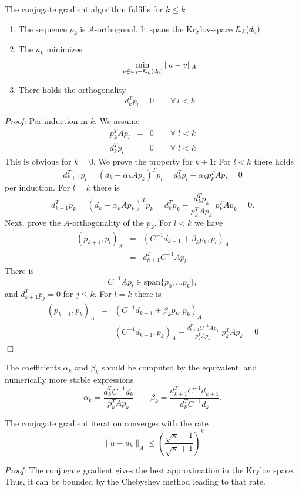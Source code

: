 \begin{theorem} The conjugate gradient algorithm fulfills for $k \leq \overline{k}$
\begin{enumerate}
\item
The sequence $p_k$ is $A$-orthogonal. It spans the Krylov-space ${\cal K}_k(d_0)$
\item
The $u_k$ minimizes
$$
\min_{v \in u_0 + {\cal K}_k(d_0)} \| u - v \|_A
$$
\item
There holds the orthogonality
$$
d_k^T p_l = 0 \qquad \forall \, l < k
$$
\end{enumerate}
\end{theorem}
\noindent
{\em Proof:} Per induction in $k$. We assume 
\begin{eqnarray*}
p_k^T A p_l & = & 0 \qquad \forall \; l < k \\
d_k^T p_l & = & 0 \qquad \forall \; l < k 
\end{eqnarray*}
This is obvious for $k = 0$. We prove the property for $k+1$:
For $l < k$ there holds
$$
d_{k+1}^T p_l = (d_k - \alpha_k A p_k)^T p_l = 
        d_k^T p_l - \alpha_k p_k^T A p_l = 0
$$
per induction. For $l = k$ there is
$$
d_{k+1}^T p_k = (d_k-\alpha_k A p_k)^T p_k = d_k^T p_k - \frac{d_k^T p_k}{p_k^T A p_k}\; p_k^T A p_k = 0.
$$ 
Next, prove the $A$-orthogonality of the $p_k$. For $l < k$ we have
\begin{eqnarray*}
(p_{k+1}, p_l)_A & = & (C^{-1} d_{k+1} + \beta_k p_k, p_l)_A \\
        & = & d_{k+1}^T C^{-1} A p_l
\end{eqnarray*}
There is
$$
C^{-1} A p_l \in \mbox{span} \{ p_0, \ldots p_k \}, 
$$
and $d_{k+1}^T p_j = 0$ for $j \leq k$. For $l = k$ there is
\begin{eqnarray*}
(p_{k+1}, p_k)_A & = & (C^{-1} d_{k+1} + \beta_k p_k, p_k)_A \\
        & = & (C^{-1} d_{k+1}, p_k)_A   
                -\frac{d_{k+1}^T C^{-1} A p_k}{p_k^T A p_k} \; p_k^T A p_k  = 0
\end{eqnarray*}
\hfill $\Box$

The coefficients $\alpha_k$ and $\beta_k$ should be computed by the equivalent,
and numerically more stable expressions
$$
\alpha_k = \frac{d_k^T C^{-1} d_k}{p_k^T A p_k} \qquad
\beta_k = \frac{d_{k+1}^T C^{-1} d_{k+1}}{d_k^T C^{-1} d_k}.
$$

\begin{theorem} The conjugate gradient iteration converges with the rate
$$
\| u - u_k \|_A \leq  \left( \frac{\sqrt{\kappa} - 1}{\sqrt{\kappa}+1} \right)^k
$$
\end{theorem}
{\em Proof:} The conjugate gradient gives the best approximation in the
Krylov space. Thus, it can be bounded by the Chebyshev method leading to that rate.


